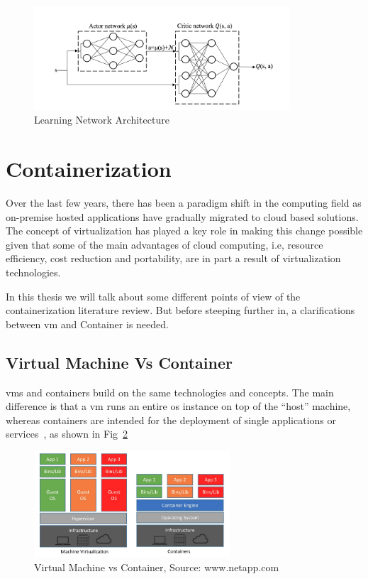 \begin{figure}[H]
    \centering
    \caption{\label{fig:ddpg} Learning Network Architecture~\cite{practicalDeepLearningStock}}
    \includegraphics[width=0.85\textwidth]{figures/DDPG.png}
\end{figure}

\section{Containerization}

Over the last few years, there has been a paradigm shift in the computing field as on-premise hosted applications have gradually migrated to cloud based solutions. The concept of virtualization has played a key role in making this change possible given that some of the main advantages of cloud computing, i.e, resource efficiency, cost reduction and portability, are in part a result of virtualization technologies.

In this thesis we will talk about some different points of view of the containerization literature review. But before steeping further in, a clarifications between \gls{vm} and Container is needed.

\newpage
\subsection{Virtual Machine Vs Container}

\glspl{vm} and containers build on the same technologies and concepts. The main difference is that a \gls{vm} runs an entire \gls{os} instance on top of the \enquote{host} machine, whereas containers are intended for the deployment of single applications or services~\cite{containersStateOfArt}, as shown in Fig~\ref{fig:vm-container}

\begin{figure}[H]
    \centering
    \caption{\label{fig:vm-container} Virtual Machine vs Container, Source: www.netapp.com~\cite{vmVsContainer}}
    \includegraphics[width=0.65\textwidth]{figures/vm & container.png}
\end{figure}

